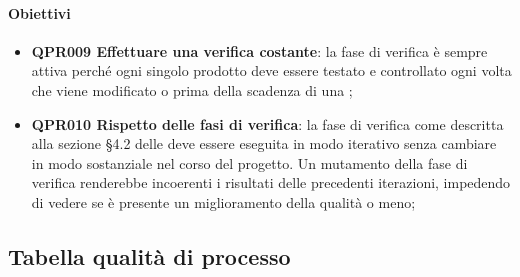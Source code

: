 		\paragraph*{Obiettivi}
		
		\begin{itemize}
			\item \textbf{QPR009 Effettuare una verifica costante}: la fase di verifica è sempre attiva perché ogni singolo prodotto deve essere testato e controllato ogni volta che viene modificato o prima della scadenza di una ;
			\item \textbf{QPR010 Rispetto delle fasi di verifica}: la fase di verifica come descritta alla sezione §4.2 delle \Doc{\NdP} deve essere eseguita in modo iterativo senza cambiare in modo sostanziale nel corso del progetto. Un mutamento della fase di verifica renderebbe incoerenti i risultati delle precedenti iterazioni, impedendo di vedere se è presente un miglioramento della qualità o meno; 
		\end{itemize}

\subsection{Tabella qualità di processo}

